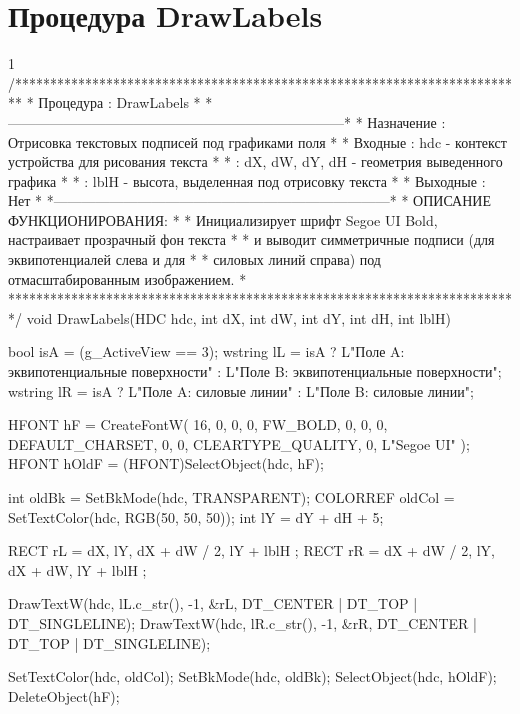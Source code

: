 \section{Процедура DrawLabels}
\footnotesize
\begin{listing}{1}
/*************************************************************************
* Процедура      : DrawLabels                                            *
*------------------------------------------------------------------------*
* Назначение     : Отрисовка текстовых подписей под графиками поля       *
* Входные        : hdc  - контекст устройства для рисования текста       *
*                : dX, dW, dY, dH - геометрия выведенного графика        *
*                : lblH - высота, выделенная под отрисовку текста        *
* Выходные       : Нет                                                   *
*------------------------------------------------------------------------*
* ОПИСАНИЕ ФУНКЦИОНИРОВАНИЯ:                                             *
* Инициализирует шрифт Segoe UI Bold, настраивает прозрачный фон текста  *
* и выводит симметричные подписи (для эквипотенциалей слева и для       *
* силовых линий справа) под отмасштабированным изображением.            *
*************************************************************************/
void DrawLabels(HDC hdc, int dX, int dW, int dY, int dH, int lblH) {
    bool isA = (g_ActiveView == 3);
    wstring lL = isA ? L"Поле A: эквипотенциальные поверхности" 
                     : L"Поле B: эквипотенциальные поверхности";
    wstring lR = isA ? L"Поле A: силовые линии" : L"Поле B: силовые линии";
    
    HFONT hF = CreateFontW(
        16, 0, 0, 0, FW_BOLD, 0, 0, 0, DEFAULT_CHARSET,
        0, 0, CLEARTYPE_QUALITY, 0, L"Segoe UI"
    );
    HFONT hOldF = (HFONT)SelectObject(hdc, hF);
    
    int oldBk = SetBkMode(hdc, TRANSPARENT);
    COLORREF oldCol = SetTextColor(hdc, RGB(50, 50, 50));
    int lY = dY + dH + 5;
    
    RECT rL = { dX, lY, dX + dW / 2, lY + lblH };
    RECT rR = { dX + dW / 2, lY, dX + dW, lY + lblH };
    
    DrawTextW(hdc, lL.c_str(), -1, &rL, DT_CENTER | DT_TOP | DT_SINGLELINE);
    DrawTextW(hdc, lR.c_str(), -1, &rR, DT_CENTER | DT_TOP | DT_SINGLELINE);
    
    SetTextColor(hdc, oldCol);
    SetBkMode(hdc, oldBk);
    SelectObject(hdc, hOldF);
    DeleteObject(hF);
}
\end{listing}
\normalsize

